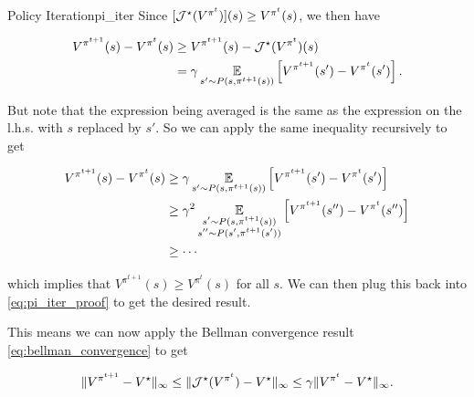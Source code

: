 \documentclass[../main/main]{subfiles}
\begin{document}
\begin{theorem}{Policy Iteration}{pi_iter}
Since $[\mathcal{J}^{\star}(V^{\pi^{t}})](s) \ge V^{\pi^{t}}(s)$, we then have

\begin{equation}
    \begin{aligned}
        V^{\pi^{t+1}}(s) - V^{\pi^{t}}(s) &\ge V^{\pi^{t+1}}(s) - \mathcal{J}^{\star} (V^{\pi^{t}})(s) \nonumber \\
        &= \gamma \operatorname*{\mathbb{E}}_{s' \sim P(s, \pi^{t+1}(s))} \left[V^{\pi^{t+1}}(s') -  V^{\pi^{t}}(s') \right].
    \end{aligned} \label{eq:pi_iter_proof}
\end{equation}

But note that the expression being averaged is the same as the expression on the l.h.s. with $s$ replaced by $s'$. So we can apply the same inequality recursively to get

\begin{align*}
    V^{\pi^{t+1}}(s) - V^{\pi^{t}}(s) &\ge  \gamma \operatorname*{\mathbb{E}}_{s' \sim P(s, \pi^{t+1}(s))} \left[V^{\pi^{t+1}}(s') -  V^{\pi^{t}}(s') \right] \\
    &\ge \gamma^2 \operatorname*{\mathbb{E}}_{\substack{s' \sim P(s, \pi^{t+1}(s)) \\ s'' \sim P(s', \pi^{t+1}(s'))}} \left[V^{\pi^{t+1}}(s'') -  V^{\pi^{t}}(s'') \right]\\
    &\ge \cdots
\end{align*}

which implies that $V^{\pi^{t+1}}(s) \ge V^{\pi^{t}}(s)$ for all $s$. We can then plug this back into \ref{eq:pi_iter_proof} to get the desired result.

This means we can now apply the Bellman convergence result \ref{eq:bellman_convergence} to get

\[
    \|V^{\pi^{t+1}} - V^\star \|_{\infty} \le \|\mathcal{J}^{\star} (V^{\pi^{t}}) - V^{\star}\|_{\infty} \le \gamma \|V^{\pi^{t}} - V^\star \|_{\infty}.
\]

\end{theorem}
\end{document}

